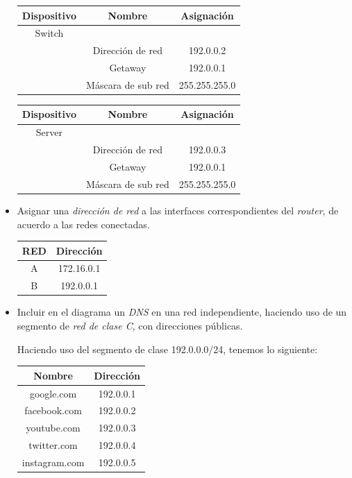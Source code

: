 \documentclass[spanish,12pt,letterpaper]{article}
\begin{document}
\begin{itemize}
  \begin{table}[H]
    \centering
    \begin{tabular}{| c | c | c |}\hline
      Dispositivo & Nombre & Asignación\\ \hline
      Switch & & \\ \hline
      & Dirección de red & 192.0.0.2 \\ \hline
      & Getaway & 192.0.0.1 \\ \hline
      & Máscara de sub red & 255.255.255.0 \\ \hline
    \end{tabular}
  \end{table}

  \begin{table}[H]
    \centering
    \begin{tabular}{| c | c | c |}\hline
      Dispositivo & Nombre & Asignación\\ \hline
      Server & & \\ \hline
      & Dirección de red & 192.0.0.3 \\ \hline
      & Getaway & 192.0.0.1 \\ \hline
      & Máscara de sub red & 255.255.255.0 \\ \hline
    \end{tabular}
  \end{table}
  
\item Asignar una \textit{dirección de red} a las interfaces correspondientes del
  \textit{router}, de acuerdo a las redes conectadas.

  \begin{table}[H]
    \centering
    \begin{tabular}{| c | c |}\hline
      RED & Dirección \\ \hline
      A & 172.16.0.1\\ \hline
      B & 192.0.0.1 \\ \hline
    \end{tabular}
  \end{table}  
  
\item Incluir en el diagrama un \textit{DNS} en una red independiente, haciendo
  uso de un segmento de \textit{red de clase C}, con direcciones públicas.

Haciendo uso del segmento de clase 192.0.0.0/24, tenemos lo siguiente:
  
  \begin{table}[H]
    \centering
    \begin{tabular}{| c | c |}\hline
      Nombre & Dirección \\ \hline
      google.com & 192.0.0.1 \\ \hline
      facebook.com & 192.0.0.2 \\ \hline
      youtube.com & 192.0.0.3 \\ \hline
      twitter.com & 192.0.0.4 \\ \hline
      instagram.com & 192.0.0.5 \\ \hline
    \end{tabular}
  \end{table}


\end{itemize}
\end{document}
